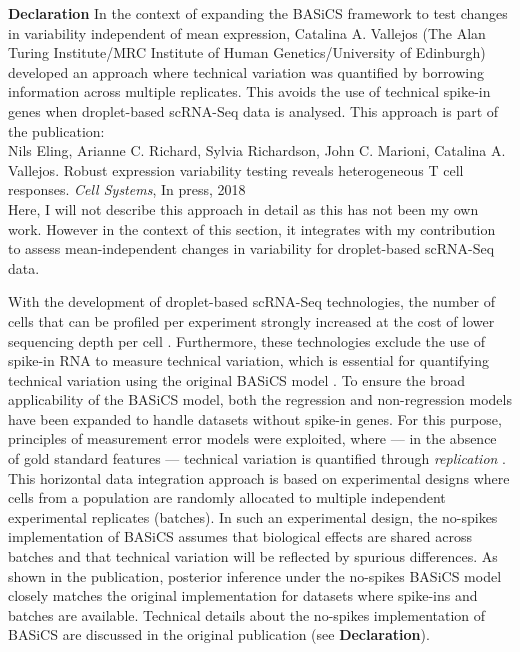 \begin{Comment}
\hspace{-3mm} \textbf{Declaration} In the context of expanding the BASiCS framework to test changes in variability independent of mean expression, Catalina A. Vallejos (The Alan Turing Institute/MRC Institute of Human Genetics/University of Edinburgh) developed an approach where technical variation was quantified by borrowing information across multiple replicates. 
This avoids the use of technical spike-in genes when droplet-based scRNA-Seq data is analysed. 
This approach is part of the publication:\\

Nils Eling, Arianne C. Richard, Sylvia Richardson, John C. Marioni, Catalina A. Vallejos. Robust expression variability testing reveals heterogeneous T cell responses. \emph{Cell Systems}, In press, 2018 \\

Here, I will not describe this approach in detail as this has not been my own work. 
However in the context of this section, it integrates with my contribution to assess mean-independent changes in variability for droplet-based scRNA-Seq data.
\end{Comment}

With the development of droplet-based scRNA-Seq technologies, the number of cells that can be profiled per experiment strongly increased at the cost of lower sequencing depth per cell \citep{Macosko2015, Klein2015, Zheng2017}. 
Furthermore, these technologies exclude the use of spike-in RNA to measure technical variation, which is essential for quantifying technical variation using the original BASiCS model \citep{Vallejos2015BASiCS, Vallejos2016}. 
To ensure the broad applicability of the BASiCS model, both the regression and non-regression models have been expanded to handle datasets without spike-in genes. 
For this purpose, principles of measurement error models were exploited, where --- in the absence of gold standard features --- technical variation is quantified through {\it replication} \citep{Carroll1998}. 
This horizontal data integration approach is based on experimental designs where cells from a population are randomly allocated to multiple independent experimental replicates (batches). 
In such an experimental design, the no-spikes implementation of BASiCS assumes that biological effects are shared across batches and that technical variation will be reflected by spurious differences. 
As shown in the publication, posterior inference under the no-spikes BASiCS model closely matches the original implementation for datasets where spike-ins and batches are available. 
Technical details about the no-spikes implementation of BASiCS are discussed in the original publication (see \textbf{Declaration}).

